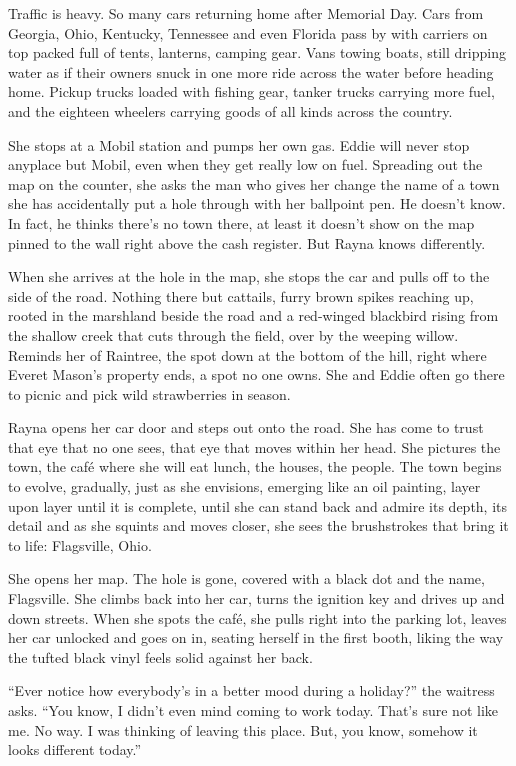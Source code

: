\documentclass[twoside,10pt]{book}
\begin{document}
Traffic is heavy. So many cars returning home after Memorial Day. Cars
from Georgia, Ohio, Kentucky, Tennessee and even Florida pass by with
carriers on top packed full of tents, lanterns, camping gear. Vans
towing boats, still dripping water as if their owners snuck in one more
ride across the water before heading home. Pickup trucks loaded with
fishing gear, tanker trucks carrying more fuel, and the eighteen
wheelers carrying goods of all kinds across the country.

She stops at a Mobil station and pumps her own gas. Eddie will never
stop anyplace but Mobil, even when they get really low on fuel.
Spreading out the map on the counter, she asks the man who gives her
change the name of a town she has accidentally put a hole through with
her ballpoint pen. He doesn't know. In fact, he thinks there's no town
there, at least it doesn't show on the map pinned to the wall right
above the cash register. But Rayna knows differently.

When she arrives at the hole in the map, she stops the car and pulls off
to the side of the road. Nothing there but cattails, furry brown spikes
reaching up, rooted in the marshland beside the road and a red-winged
blackbird rising from the shallow creek that cuts through the field,
over by the weep­ing willow. Reminds her of Raintree, the spot down at
the bottom of the hill, right where Everet Mason's property ends, a spot
no one owns. She and Eddie often go there to picnic and pick wild
strawberries in season.

Rayna opens her car door and steps out onto the road. She has come to
trust that eye that no one sees, that eye that moves within her head.
She pictures the town, the café where she will eat lunch, the houses,
the people. The town begins to evolve, gradually, just as she envisions,
emerging like an oil painting, layer upon layer until it is complete,
until she can stand back and admire its depth, its detail and as she
squints and moves closer, she sees the brushstrokes that bring it to
life: Flagsville, Ohio.

She opens her map. The hole is gone, covered with a black dot and the
name, Flagsville. She climbs back into her car, turns the ignition key
and drives up and down streets. When she spots the café, she pulls right
into the parking lot, leaves her car unlocked and goes on in, seating
herself in the first booth, liking the way the tufted black vinyl feels
solid against her back.

``Ever notice how everybody's in a better mood during a holiday?'' the
waitress asks. ``You know, I didn't even mind coming to work today.
That's sure not like me. No way. I was thinking of leaving this place.
But, you know, somehow it looks different today.''
\end{document}
